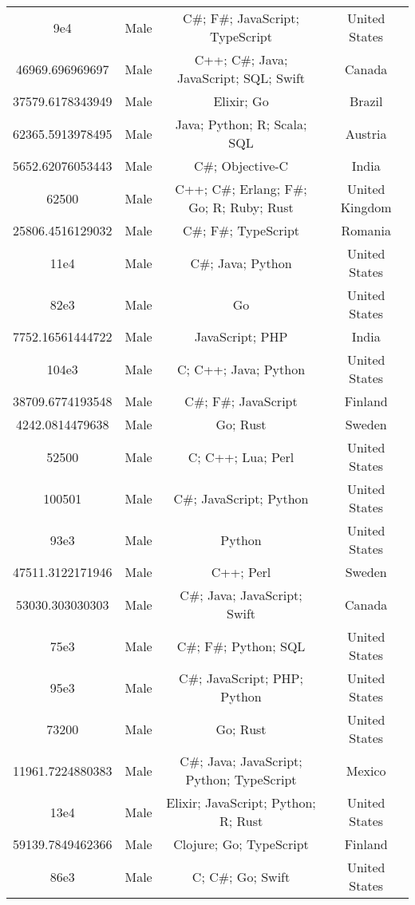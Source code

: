 \begin{center}
\begin{tabular}{ |c|c|c|c| }
9e4  &  Male  &  C\#; F\#; JavaScript; TypeScript  &  United States  \\ 
46969.696969697  &  Male  &  C++; C\#; Java; JavaScript; SQL; Swift  &  Canada  \\ 
37579.6178343949  &  Male  &  Elixir; Go  &  Brazil  \\ 
62365.5913978495  &  Male  &  Java; Python; R; Scala; SQL  &  Austria  \\ 
5652.62076053443  &  Male  &  C\#; Objective-C  &  India  \\ 
62500  &  Male  &  C++; C\#; Erlang; F\#; Go; R; Ruby; Rust  &  United Kingdom  \\ 
25806.4516129032  &  Male  &  C\#; F\#; TypeScript  &  Romania  \\ 
11e4  &  Male  &  C\#; Java; Python  &  United States  \\ 
82e3  &  Male  &  Go  &  United States  \\ 
7752.16561444722  &  Male  &  JavaScript; PHP  &  India  \\ 
104e3  &  Male  &  C; C++; Java; Python  &  United States  \\ 
38709.6774193548  &  Male  &  C\#; F\#; JavaScript  &  Finland  \\ 
4242.0814479638  &  Male  &  Go; Rust  &  Sweden  \\ 
52500  &  Male  &  C; C++; Lua; Perl  &  United States  \\ 
100501  &  Male  &  C\#; JavaScript; Python  &  United States  \\ 
93e3  &  Male  &  Python  &  United States  \\ 
47511.3122171946  &  Male  &  C++; Perl  &  Sweden  \\ 
53030.303030303  &  Male  &  C\#; Java; JavaScript; Swift  &  Canada  \\ 
75e3  &  Male  &  C\#; F\#; Python; SQL  &  United States  \\ 
95e3  &  Male  &  C\#; JavaScript; PHP; Python  &  United States  \\ 
73200  &  Male  &  Go; Rust  &  United States  \\ 
11961.7224880383  &  Male  &  C\#; Java; JavaScript; Python; TypeScript  &  Mexico  \\ 
13e4  &  Male  &  Elixir; JavaScript; Python; R; Rust  &  United States  \\ 
59139.7849462366  &  Male  &  Clojure; Go; TypeScript  &  Finland  \\ 
86e3  &  Male  &  C; C\#; Go; Swift  &  United States  \\ 

\end{tabular}
\end{center}
